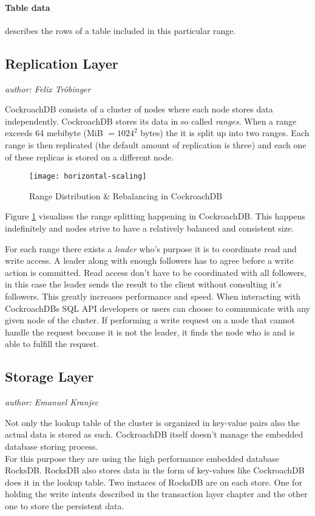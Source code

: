 \paragraph{Table data}
describes the rows of a table included in this particular range.

\newpage
\subsection{Replication Layer}
\emph{author: Felix Tröbinger}\bigskip

CockroachDB consists of a cluster of nodes where each node stores data independently.
CockroachDB stores its data in so called \emph{ranges}. When a range exceeds 64 mebibyte (MiB $ = 1024^2$ bytes) the it is split up into two ranges. Each range is then replicated (the default amount of replication is three) and each one of these replicas is stored on a different node.

\begin{figure}[H]
    \texttt{[image: horizontal-scaling]}
    \caption{Range Distribution & Rebalancing in CockroachDB\cite{cockroach-newstack}}
    \label{fig:scaling}
\end{figure}

Figure \ref{fig:scaling} visualizes the range splitting happening in CockroachDB. This happens indefinitely and nodes strive to have a relatively balanced and consistent size.

\medskip
For each range there exists a \emph{leader} who's purpose it is to coordinate read and write access. A leader along with enough followers has to agree before a write action is committed.
Read access don't have to be coordinated with all followers, in this case the leader sends the result to the client without consulting it's followers. This greatly increases performance and speed.
When interacting with CockroachDBs SQL API developers or users can choose to communicate with any given node of the cluster.
If performing a write request on a node that cannot handle the request because it is not the leader, it finds the node who is and is able to fulfill the request.
\cite{cockroach-architecture}

\newpage
\subsection{Storage Layer}
\emph{author: Emanuel Kranjec}\bigskip

Not only the lookup table of the cluster is organized in key-value pairs also the actual data is stored as such. CockroachDB
itself doesn't manage the embedded database storing process.\\
For this purpose they are using the high performance embedded database RocksDB. RocksDB also stores data in the form of 
key-values like CockroachDB does it in the lookup table. Two instaces of RocksDB are on each store. One for holding the write 
intents described in the transaction layer chapter and the other one to store the 
persistent data.\\\\

